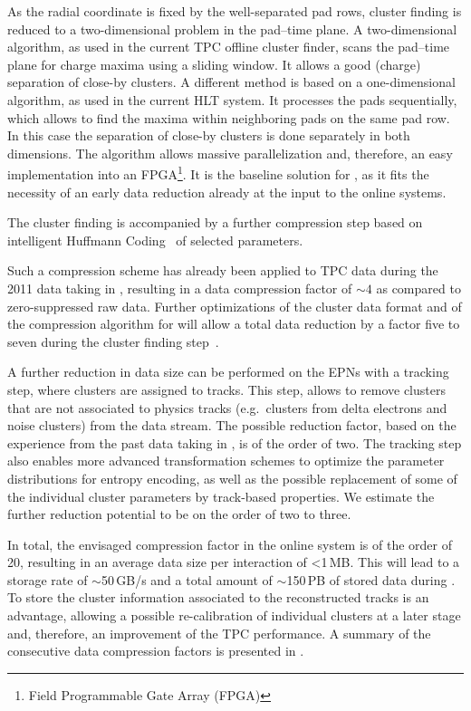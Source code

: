 As the radial coordinate is fixed by the well-separated pad
rows, cluster finding is reduced to a two-dimensional problem in the
pad--time plane.
A two-dimensional algorithm, as used in the current TPC offline cluster
finder, scans the pad--time plane for charge maxima using a
sliding window. It allows a good (charge) separation of close-by
clusters. A different method is based on a one-dimensional algorithm,
as used in the current HLT system. It processes the pads sequentially,
which allows to find the maxima within neighboring pads on the same
pad row. In this case the separation of close-by clusters is done
separately in both dimensions. The algorithm allows massive
parallelization and, therefore, an easy implementation into an
FPGA\footnote{Field Programmable Gate Array (FPGA)}. It is the
baseline solution for , as it fits the necessity of an early
data reduction already at the input to the online systems.

The cluster finding is accompanied by a further compression step based
on intelligent Huffmann Coding~\cite{4051119Huffmann}  of selected
parameters.

Such a compression scheme has already been applied to TPC data during
the 2011 \pbpb data taking in , resulting in a data compression
factor of $\sim4$ as compared to zero-suppressed raw data. Further
optimizations of the
cluster data format and of the compression algorithm for  will
allow a total data reduction by a factor five to seven during the
cluster finding step~\cite{ALICELOI}.

A further reduction in data size can be performed on the EPNs with a
tracking step, where clusters are assigned to tracks.
This step, allows to remove clusters that are not associated to
physics tracks (e.g.~clusters from delta electrons and noise clusters)
from the data stream. The possible reduction factor, based on the
experience from the past data taking in , is of the order of
two. The tracking step also enables more advanced transformation
schemes to optimize the parameter distributions for entropy encoding,
as well as the possible replacement of some of the individual cluster
parameters by track-based properties. We estimate the further
reduction potential to be on the order of two to three.

In total, the envisaged compression factor in the online system is of
the order of 20, resulting in an average data size per interaction of
<1\,MB. This will lead to a storage rate of
$\sim$50\,GB/s and a total amount of
$\sim$150\,PB
of stored data during .
To store the cluster information associated to the reconstructed tracks
is an advantage, allowing a possible re-calibration of individual
clusters at a later stage and, therefore, an improvement of the TPC
performance.
A summary of the consecutive data compression factors is presented in
.

